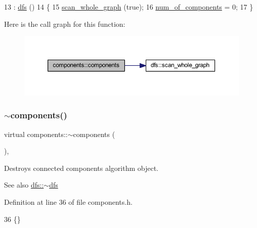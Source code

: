 \begin{DoxyCode}
13                         : \mbox{\hyperlink{classdfs_afe4e213d3f1f88a4ff57b2d72de232f4}{dfs}} ()
14 \{
15     \mbox{\hyperlink{classdfs_a025ed2d6101a7b9f72578a52b484ef50}{scan\_whole\_graph}} (\textcolor{keyword}{true});
16     \mbox{\hyperlink{classcomponents_ad5a54d7313e23f8c6a2c6347e6ee70a0}{num\_of\_components}} = 0;
17 \}
\end{DoxyCode}
Here is the call graph for this function\+:\nopagebreak
\begin{figure}[H]
\begin{center}
\leavevmode
\includegraphics[width=350pt]{classcomponents_af6a1be8a61478e8c8115cb66a40c9636_cgraph}
\end{center}
\end{figure}
\mbox{\label{classcomponents_aa38e55d08dd484dad3175617264056a5}} 
\subsubsection{\texorpdfstring{$\sim$components()}{~components()}}
{\footnotesize\ttfamily virtual components\+::$\sim$components (\begin{DoxyParamCaption}{ }\end{DoxyParamCaption})\hspace{0.3cm}{\ttfamily [inline]}, {\ttfamily [virtual]}}



Destroys connected components algorithm object. 

\begin{DoxySeeAlso}{See also}
\mbox{\hyperlink{classdfs_aff2e95c12935221a94551393f7e36c6e}{dfs\+::$\sim$dfs}} 
\end{DoxySeeAlso}


Definition at line 36 of file components.\+h.


\begin{DoxyCode}
36 \{\}
\end{DoxyCode}


